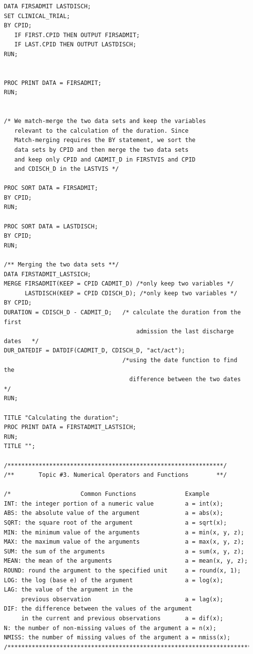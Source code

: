 \documentclass[
]{book}
\begin{document}
\begin{verbatim}
DATA FIRSADMIT LASTDISCH;
SET CLINICAL_TRIAL;
BY CPID;
   IF FIRST.CPID THEN OUTPUT FIRSADMIT;
   IF LAST.CPID THEN OUTPUT LASTDISCH;
RUN;


PROC PRINT DATA = FIRSADMIT;
RUN;


/* We match-merge the two data sets and keep the variables
   relevant to the calculation of the duration. Since 
   Match-merging requires the BY statement, we sort the
   data sets by CPID and then merge the two data sets
   and keep only CPID and CADMIT_D in FIRSTVIS and CPID 
   and CDISCH_D in the LASTVIS */

PROC SORT DATA = FIRSADMIT;
BY CPID;
RUN;

PROC SORT DATA = LASTDISCH;
BY CPID;
RUN;

/** Merging the two data sets **/
DATA FIRSTADMIT_LASTSICH;
MERGE FIRSADMIT(KEEP = CPID CADMIT_D) /*only keep two variables */
      LASTDISCH(KEEP = CPID CDISCH_D); /*only keep two variables */
BY CPID;
DURATION = CDISCH_D - CADMIT_D;   /* calculate the duration from the first
                                      admission the last discharge dates   */
DUR_DATEDIF = DATDIF(CADMIT_D, CDISCH_D, "act/act"); 
                                  /*using the date function to find the
                                    difference between the two dates */
RUN;

TITLE "Calculating the duration";
PROC PRINT DATA = FIRSTADMIT_LASTSICH;
RUN;
TITLE "";

/**************************************************************/
/**       Topic #3. Numerical Operators and Functions        **/

/*                    Common Functions              Example
INT: the integer portion of a numeric value         a = int(x);
ABS: the absolute value of the argument             a = abs(x);
SQRT: the square root of the argument               a = sqrt(x);
MIN: the minimum value of the arguments             a = min(x, y, z);
MAX: the maximum value of the arguments             a = max(x, y, z);
SUM: the sum of the arguments                       a = sum(x, y, z);
MEAN: the mean of the arguments                     a = mean(x, y, z);
ROUND: round the argument to the specified unit     a = round(x, 1);
LOG: the log (base e) of the argument               a = log(x);
LAG: the value of the argument in the 
     previous observation                           a = lag(x);
DIF: the difference between the values of the argument 
     in the current and previous observations       a = dif(x);
N: the number of non-missing values of the argument a = n(x);
NMISS: the number of missing values of the argument a = nmiss(x);
/***************************************************************************/


\end{verbatim}
\end{document}
